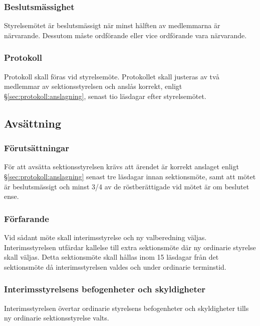 \subsubsection{Beslutsmässighet}
Styrelsemötet är beslutsmässigt när minst hälften av medlemmarna är närvarande. Dessutom måste ordförande eller vice ordförande vara närvarande.

\subsubsection{Protokoll}
Protokoll skall föras vid styrelsemöte. Protokollet skall justeras av två medlemmar av sektionsstyrelsen och anslås korrekt, enligt §\ref{sec:protokoll:anslagning}, senast tio läsdagar efter styrelsemötet.

\subsection{Avsättning}

\subsubsection{Förutsättningar}
För att avsätta sektionsstyrelsen krävs att ärendet är korrekt anslaget enligt §\ref{sec:protokoll:anslagning} senast tre läsdagar innan sektionsmöte, samt att mötet är beslutsmässigt och minst 3/4 av de röstberättigade vid mötet är om beslutet ense. 

\subsubsection{Förfarande}
Vid sådant möte skall interimsstyrelse och ny valberedning väljas. Interimsstyrelsen utfärdar kallelse till extra sektionsmöte där ny ordinarie styrelse skall väljas. Detta sektionsmöte skall hållas inom 15 läsdagar från det sektionsmöte då interimsstyrelsen valdes och under ordinarie terminstid.

\subsubsection{Interimsstyrelsens befogenheter och skyldigheter}
Interimsstyrelsen övertar ordinarie styrelsens befogenheter och skyldigheter tills ny ordinarie sektionsstyrelse valts.


